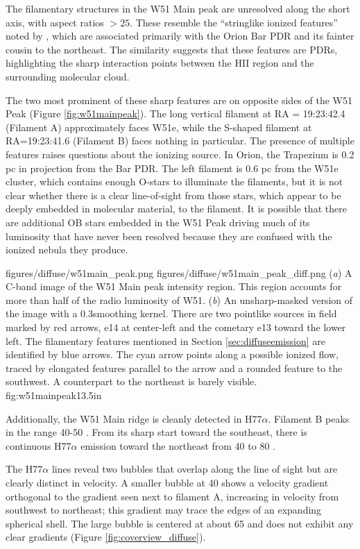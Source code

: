 The filamentary structures in the W51 Main peak are unresolved along the short
axis, with aspect ratios $>25$.   These resemble the ``stringlike ionized
features'' noted by \citet[][see
\url{http://images.nrao.edu/402}]{Yusef-Zadeh1990a}, which are associated
primarily with the Orion Bar PDR and its fainter cousin to the northeast.  The
similarity suggests that these features are PDRs, highlighting the sharp
interaction points between the HII region and the surrounding molecular cloud.

The two most prominent of these sharp features are on opposite sides of the W51
Peak (Figure \ref{fig:w51mainpeak}).  The long vertical filament at RA =
19:23:42.4 (Filament A) approximately
faces W51e, while the S-shaped filament at RA=19:23:41.6 (Filament B) faces
nothing in particular.  The presence of multiple features raises questions
about the ionizing source.  In Orion, the Trapezium is 0.2 pc in projection
from the Bar PDR.  The left filament is 0.6 pc from the W51e cluster, which
contains enough O-stars to illuminate the filaments, but it is not clear
whether there is a clear line-of-sight from those stars, which appear to be
deeply embedded in molecular material, to the filament.  It is possible that
there are additional OB stars embedded in the W51 Peak driving much of its
luminosity that have never been resolved because they are confused with the
ionized nebula they produce.

\FigureTwo
{figures/diffuse/w51main_peak.png}
{figures/diffuse/w51main_peak_diff.png}
{({\it a}) A C-band image of the W51 Main peak intensity region.  This region
accounts for more than half of the radio luminosity of W51.
({\it b}) An unsharp-masked version of the image with a 0.3\arcsec smoothing
kernel. 
There are
two pointlike sources in field marked by red arrows, e14 at center-left and the
cometary e13 toward the lower left.
The filamentary features mentioned in Section \ref{sec:diffuseemission} are
identified by blue arrows.  The cyan arrow points along a possible ionized flow,
traced by elongated features parallel to the arrow and a rounded feature to the
southwest.  A counterpart to the northeast is barely visible.
}
{fig:w51mainpeak}{1}{3.5in}

Additionally, the W51 Main ridge is cleanly detected in H77$\alpha$.  Filament
B peaks in the range 40-50 \kms.  From its sharp start toward the southeast,
there is continuous H77$\alpha$ emission toward the northeast from 40 to 80
\kms.

The H77$\alpha$ lines reveal two bubbles that overlap along the line of sight but
are clearly distinct in velocity.  A smaller bubble at 40 \kms shows a velocity
gradient orthogonal to the gradient seen next to filament A, increasing in
velocity from southwest to northeast; this gradient may trace the edges of an expanding
spherical shell.  The large bubble is centered at about 65 \kms and does not
exhibit any clear gradients (Figure \ref{fig:coverview_diffuse}).

